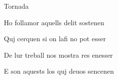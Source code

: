 \documentclass[12pt]{article}
\begin{document}
\begin{estrofaExtra}%




\begin{tornada}

\textsection{}Tornada\textsection{}

\end{tornada}


\end{estrofaExtra}


\begin{estrofa}

 Ho follamor aquells delit sostenen

 Quj cerquen si on lafi no pot esser

 De lur treball nos mostra res enesser

 E son aquests los quj deuos sencenen

\end{estrofa}
\end{document}
